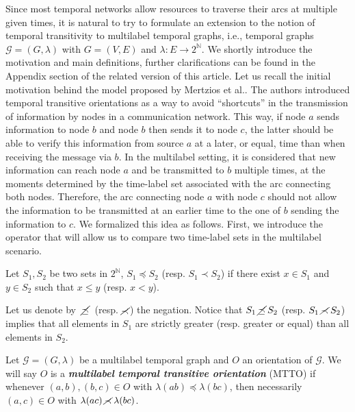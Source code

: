 \documentclass[runningheads]{llncs}
\newcommand{\bfit}[1]{\textbf{\textit{#1}}}
\begin{document}
Since most temporal networks allow resources to traverse their arcs at multiple given times, it is natural to try to formulate an extension to the notion of temporal transitivity to multilabel temporal graphs, i.e., temporal graphs $\mathcal{G}=(G,\lambda)$ with $G=(V,E)$ and $\lambda: E \rightarrow 2^{\mathds{N}}$. We shortly introduce the motivation and main definitions, further clarifications can be found in the Appendix section of the related version of this article. Let us recall the initial motivation behind the model proposed by Mertzios et al.\cite{mertzios2025complexity}. The authors introduced temporal transitive orientations as a way to avoid \enquote{shortcuts} in the transmission of information by nodes in a communication network. This way, if node $a$ sends information to node $b$ and node $b$ then sends it to node $c$, the latter should be able to verify this information from source $a$ at a later, or equal, time than when receiving the message via $b$. In the multilabel setting, it is considered that new information can reach node $a$ and be transmitted to $b$ multiple times, at the moments determined by the time-label set associated with the arc connecting both nodes. Therefore, the arc connecting node $a$ with node $c$ should not allow the information to be transmitted at an earlier time to the one of $b$ sending the information to $c$. We formalized this idea as follows. First, we introduce the operator that will allow us to compare two time-label sets in the multilabel scenario.

\begin{definition}
Let $S_1,S_2$ be two sets in $2^{\mathds{N}}$, $S_1 \preceq S_2$ (resp. $S_1 \prec S_2$) if there exist $x \in S_1$ and $y  \in S_2$ such that $x \leq y$ (resp. $x < y$).
\end{definition}

Let us denote by  $\hspace{0.5ex} \cancel{\preceq} \hspace{0.5ex}$ (resp. $\cancel{\prec}$) the negation. Notice that $S_1 \hspace{0.5ex} \cancel{\preceq} \hspace{0.5ex} S_2$ (resp. $S_1 \hspace{0.5ex} \cancel{\prec} \hspace{0.5ex} S_2$) implies that all elements in $S_1$ are strictly greater (resp. greater or equal) than all elements in $S_2$.

\begin{definition}
Let $\mathcal{G}=(G,\lambda)$ be a multilabel temporal graph and $O$ an orientation of $\mathcal{G}$. We will say $O$ is a \bfit{multilabel temporal transitive orientation} (MTTO) if whenever $(a,b),(b,c) \in O$ with $\lambda(ab) \preceq \lambda(bc)$, then necessarily $(a,c) \in O$ with $\lambda(ac) \hspace{0.5ex} \cancel{\prec} \hspace{0.5ex} \lambda(bc)$.
\end{definition}
\end{document}
